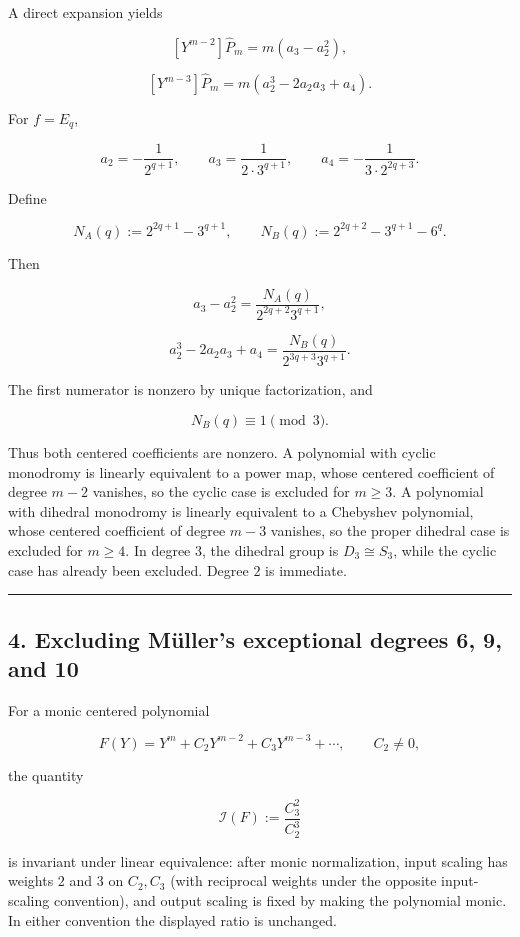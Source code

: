 A direct expansion yields

\[
 [Y^{m-2}]\widehat P_m=m(a_3-a_2^2),
\]

\[
 [Y^{m-3}]\widehat P_m=m(a_2^3-2a_2a_3+a_4).
\]

For \(f=E_q\),

\[
 a_2=-\frac1{2^{q+1}},\qquad
 a_3=\frac1{2\cdot3^{q+1}},\qquad
 a_4=-\frac1{3\cdot2^{2q+3}}.
\]

Define

\[
 N_A(q):=2^{2q+1}-3^{q+1},
 \qquad
 N_B(q):=2^{2q+2}-3^{q+1}-6^q.
\]

Then

\[
 a_3-a_2^2
 =\frac{N_A(q)}{2^{2q+2}3^{q+1}},
\]

\[
 a_2^3-2a_2a_3+a_4
 =\frac{N_B(q)}{2^{3q+3}3^{q+1}}.
\]

The first numerator is nonzero by unique factorization, and

\[
 N_B(q)\equiv1\pmod3.
\]

Thus both centered coefficients are nonzero. A polynomial with cyclic
monodromy is linearly equivalent to a power map, whose centered coefficient
of degree \(m-2\) vanishes, so the cyclic case is excluded for \(m\ge3\).
A polynomial with dihedral monodromy is linearly
equivalent to a Chebyshev polynomial, whose centered coefficient of degree
\(m-3\) vanishes, so the proper dihedral case is excluded for \(m\ge4\).
In degree \(3\), the dihedral group is \(D_3\cong S_3\), while the cyclic
case has already been excluded. Degree \(2\) is immediate.

\begin{center}\rule{0.5\linewidth}{0.5pt}\end{center}

\subsection{4. Excluding Müller's exceptional degrees 6, 9, and 10}

For a monic centered polynomial

\[
 F(Y)=Y^m+C_2Y^{m-2}+C_3Y^{m-3}+\cdots,
 \qquad C_2\ne0,
\]

the quantity

\[
 \mathcal I(F):=\frac{C_3^2}{C_2^3}
\]

is invariant under linear equivalence: after monic normalization, input
scaling has weights \(2\) and \(3\) on \(C_2,C_3\) (with reciprocal weights
under the opposite input-scaling convention), and output scaling is fixed by
making the polynomial monic. In either convention the displayed ratio is
unchanged.

